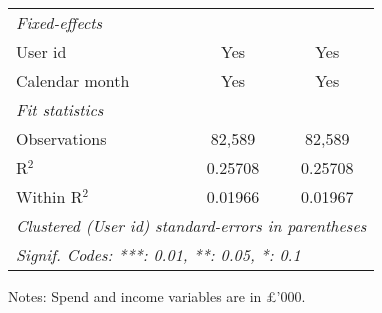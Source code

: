 \begin{table}[htbp]
\begin{threeparttable}[b]
\begin{tabular}{lcc}
         \midrule
         \emph{Fixed-effects}\\
         User id             & Yes            & Yes\\  
         Calendar month      & Yes            & Yes\\  
         \midrule
         \emph{Fit statistics}\\
         Observations        & 82,589         & 82,589\\  
         R$^2$               & 0.25708        & 0.25708\\  
         Within R$^2$        & 0.01966        & 0.01967\\  
         \midrule \midrule
         \multicolumn{3}{l}{\emph{Clustered (User id) standard-errors in parentheses}}\\
         \multicolumn{3}{l}{\emph{Signif. Codes: ***: 0.01, **: 0.05, *: 0.1}}\\
      \end{tabular}
      
      \begin{tablenotes}\footnotesize
         \item Notes: Spend and income variables are in \pounds'000.
      \end{tablenotes}
   \end{threeparttable}
\end{table}


